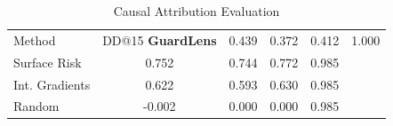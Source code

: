 \begin{table}[t]
\centering
\small
\caption{Causal Attribution Evaluation}
\label{tab:causal_eval}
\begin{tabular}{lcccc}
\toprule
Method & DD@15%
\midrule
\textbf{GuardLens} & 0.439 & 0.372 & 0.412 & 1.000 \\
Surface Risk & 0.752 & 0.744 & 0.772 & 0.985 \\
Int. Gradients & 0.622 & 0.593 & 0.630 & 0.985 \\
Random & -0.002 & 0.000 & 0.000 & 0.985 \\
\bottomrule
\end{tabular}
\end{table}